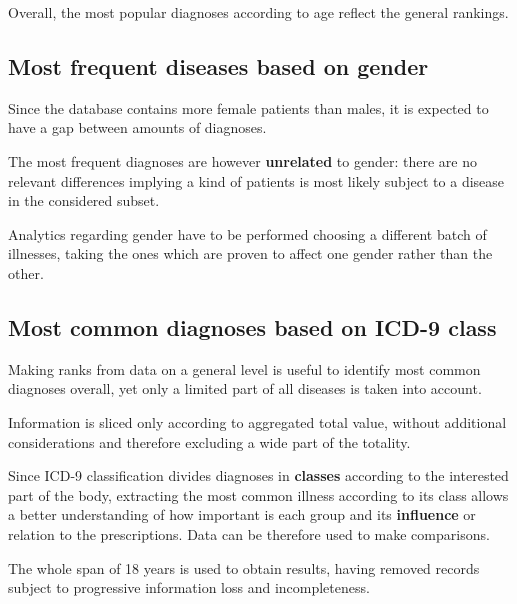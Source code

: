 Overall, the most popular diagnoses according to age reflect the general rankings.

\subsection{Most frequent diseases based on gender}
Since the database contains more female patients than males, it is expected to have a gap between amounts of diagnoses.

The most frequent diagnoses are however \textbf{unrelated} to gender: there are no relevant differences implying a kind of patients is most likely subject to a disease in the considered subset.

Analytics regarding gender have to be performed choosing a different batch of illnesses, taking the ones which are proven to affect one gender rather than the other.

\subsection{Most common diagnoses based on ICD-9 class}
Making ranks from data on a general level is useful to identify most common diagnoses overall, yet only a limited part of all diseases is taken into account.

Information is sliced only according to aggregated total value, without additional considerations and therefore excluding a wide part of the totality.

Since ICD-9 classification divides diagnoses in \textbf{classes} according to the interested part of the body, extracting the most common illness according to its class allows a better understanding of how important is each group and its \textbf{influence} or relation to the prescriptions. Data can be therefore used to make comparisons.

The whole span of 18 years is used to obtain results, having removed records subject to progressive information loss and incompleteness.


